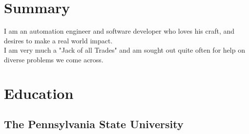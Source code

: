 \documentclass[letterpaper]{deedy-resume} %
\begin{document}

\lastupdated %



\begin{minipage}[t]{0.33\textwidth} %


\section{Summary} 

I am an automation engineer and software developer who loves his craft, and desires to make a real world impact.\\

I am very much a "Jack of all Trades" and am sought out quite often for help on diverse problems we come across.  \\

\sectionspace %


\section{Education} 

\subsection{The Pennsylvania State \newline University}



\end{minipage}
\end{document}

